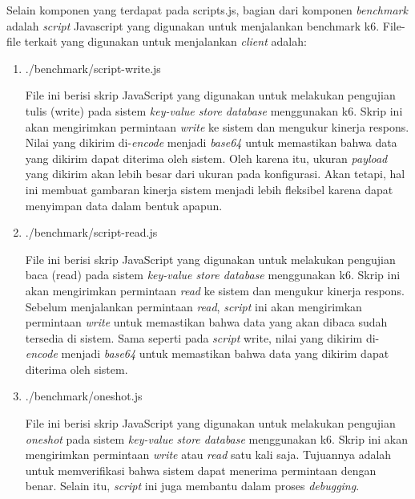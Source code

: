 Selain komponen yang terdapat pada scripts.js, bagian dari komponen \textit{benchmark} adalah \textit{script} Javascript yang digunakan untuk menjalankan benchmark k6. File-file terkait yang digunakan untuk menjalankan \textit{client} adalah:

\begin{enumerate}
  \item ./benchmark/script-write.js

  File ini berisi skrip JavaScript yang digunakan untuk melakukan pengujian tulis (write) pada sistem \textit{key-value store database} menggunakan k6. Skrip ini akan mengirimkan permintaan \textit{write} ke sistem dan mengukur kinerja respons. Nilai yang dikirim di-\textit{encode} menjadi \textit{base64} untuk memastikan bahwa data yang dikirim dapat diterima oleh sistem. Oleh karena itu, ukuran \textit{payload} yang dikirim akan lebih besar dari ukuran pada konfigurasi. Akan tetapi, hal ini membuat gambaran kinerja sistem menjadi lebih fleksibel karena dapat menyimpan data dalam bentuk apapun.

  \item ./benchmark/script-read.js
  
  File ini berisi skrip JavaScript yang digunakan untuk melakukan pengujian baca (read) pada sistem \textit{key-value store database} menggunakan k6. Skrip ini akan mengirimkan permintaan \textit{read} ke sistem dan mengukur kinerja respons. Sebelum menjalankan permintaan \textit{read}, \textit{script} ini akan mengirimkan permintaan \textit{write} untuk memastikan bahwa data yang akan dibaca sudah tersedia di sistem. Sama seperti pada \textit{script} write, nilai yang dikirim di-\textit{encode} menjadi \textit{base64} untuk memastikan bahwa data yang dikirim dapat diterima oleh sistem.

  \item ./benchmark/oneshot.js
  
  File ini berisi skrip JavaScript yang digunakan untuk melakukan pengujian \textit{oneshot} pada sistem \textit{key-value store database} menggunakan k6. Skrip ini akan mengirimkan permintaan \textit{write} atau \textit{read} satu kali saja. Tujuannya adalah untuk memverifikasi bahwa sistem dapat menerima permintaan dengan benar. Selain itu, \textit{script} ini juga membantu dalam proses \textit{debugging}.
\end{enumerate}